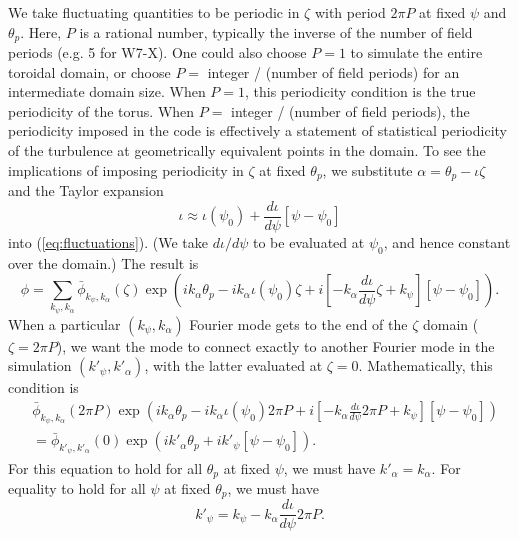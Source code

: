 \documentclass[11pt,letter]{article}
\begin{document}
We take fluctuating quantities to be periodic in $\zeta$ with period $2 \pi P$ at fixed $\psi$ and $\theta_p$.
Here, $P$ is a rational number, typically the inverse of the number of field periods (e.g. 5 for W7-X).
One could also choose $P=1$ to simulate the entire toroidal domain, or choose $P=$ integer / (number of field periods)
for an intermediate domain size. When $P=1$, this periodicity condition is the true periodicity of the torus.
When $P=$ integer / (number of field periods), the periodicity imposed in the code is effectively a statement
of statistical periodicity of the turbulence at geometrically equivalent points in the domain. To see the implications of imposing
periodicity in $\zeta$ at fixed $\theta_p$, we substitute $\alpha = \theta_p - \iota \zeta$ and the Taylor expansion
\begin{equation}
\iota \approx \iota(\psi_0) + \frac{d\iota}{d\psi} \left[ \psi - \psi_0\right]
\label{eq:Taylor_iota}
\end{equation}
into (\ref{eq:fluctuations}). (We take $d\iota/d\psi$ to be evaluated at $\psi_0$, and hence constant over the domain.) The result is
\begin{equation}
\phi
=\sum_{k_\psi, k_\alpha} \bar{\phi}_{k_\psi,k_\alpha}(\zeta) \exp
\left( i k_\alpha \theta_p  
-i k_\alpha \iota(\psi_0) \zeta
+i \left[- k_\alpha \frac{d\iota}{d\psi}  \zeta
 + k_\psi\right] \left[ \psi - \psi_0\right] \right).
\end{equation}
When a particular $(k_\psi,k_\alpha)$ Fourier mode gets to the end of the $\zeta$ domain ($\zeta = 2\pi P$), we want
the mode to connect exactly to another Fourier mode in the simulation $(k'_\psi,k'_\alpha)$, with the latter evaluated
at $\zeta=0$. Mathematically, this condition is
\begin{align}
&\bar{\phi}_{k_\psi,k_\alpha}(2\pi P) \exp
\left( i k_\alpha \theta_p  
-i k_\alpha \iota(\psi_0) 2\pi P
+i \left[- k_\alpha \frac{d\iota}{d\psi}  2 \pi P
+ k_\psi\right] \left[ \psi - \psi_0\right] \right) \nonumber \\
&=
\bar{\phi}_{k'_\psi,k'_\alpha}(0) \exp
\left( i k'_\alpha \theta_p  
+i k'_\psi\left[ \psi - \psi_0\right] \right) .
\label{eq:parallelBC}
\end{align}
For this equation to hold for all $\theta_p$ at fixed $\psi$, we must have $k'_\alpha = k_\alpha$.
For equality to hold for all $\psi$ at fixed $\theta_p$, we must have
\begin{equation}
k'_\psi
= k_\psi - k_\alpha \frac{d\iota}{d\psi}  2 \pi P.
\label{eq:twist_and_shift}
\end{equation}
\end{document}
